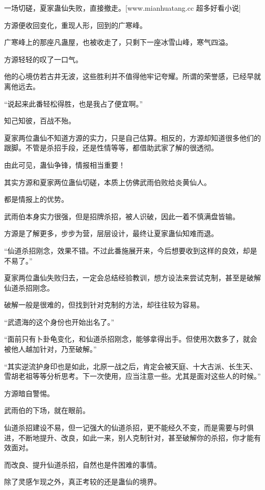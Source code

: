 
\begin{this_body}

一场切磋，夏家蛊仙失败，直接撤走。[www.mianhuatang.cc 超多好看小说]

方源便收回变化，重现人形，回到的广寒峰。

广寒峰上的那座凡蛊屋，也被收走了，只剩下一座冰雪山峰，寒气四溢。

方源轻轻的叹了一口气。

他的心境仿若古井无波，这些胜利并不值得他牢记夸耀。所谓的荣誉感，已经早就离他远去。

“说起来此番轻松得胜，也是我占了便宜啊。”

知己知彼，百战不殆。

夏家两位蛊仙不知道方源的实力，只是自己估算。相反的，方源却知道很多他们的跟脚。不管是杀招手段，还是性情等等，都借助武家了解的很透彻。

由此可见，蛊仙争锋，情报相当重要！

其实方源和夏家两位蛊仙切磋，本质上仿佛武雨伯败给炎黄仙人。

都是情报上的优势。

武雨伯本身实力很强，但是招牌杀招，被人识破，因此一着不慎满盘皆输。

方源是了解更多，步步为营，层层设计，最终让夏家蛊仙知难而退。

“仙道杀招刚念，效果不错。不过此番施展开来，今后想要收到这样的良效，却是不易了。”

夏家两位蛊仙失败归去，一定会总结经验教训，想方设法来尝试克制，甚至是破解仙道杀招刚念。

破解一般是很难的，但找到针对克制的方法，却往往较为容易。

“武遗海的这个身份也开始出名了。”

“面前只有卜卦龟变化，和仙道杀招刚念，能够拿得出手。但使用次数多了，就会被他人越加针对，乃至破解。”

“其实逆流护身印也是如此，北原一战之后，肯定会被天庭、十大古派、长生天、雪胡老祖等等分析思考。下一次使用，应当注意一些。尤其是面对这些人的时候。”

方源暗自警惕。

武雨伯的下场，就在眼前。

仙道杀招建设不易，但一记强大的仙道杀招，更不能经久不变，而是需要与时俱进，不断地提升、改良，如此一来，别人克制针对，甚至破解你的杀招，你才能有效面对。

而改良、提升仙道杀招，自然也是件困难的事情。

除了灵感乍现之外，真正考较的还是蛊仙的境界。


\end{this_body}
